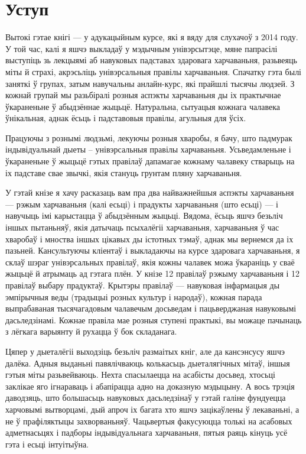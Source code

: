 \chapter*{Уступ}

Вытокі гэтае кнігі — у адукацыйным курсе, які я вяду для слухачоў з 2014 году. У той час, калі я яшчэ выкладаў у мэдычным унівэрсытэце, мяне папрасілі выступіць зь лекцыямі аб навуковых падставах здаровага харчаваньня, разьвеяць міты й страхі, акрэсьліць унівэрсальныя правілы харчаваньня. Спачатку гэта былі заняткі ў групах, затым навучальны анлайн-курс, які прайшлі тысячы людзей. З кожнай групай мы разьбіралі розныя аспэкты харчаваньня ды іх практычнае ўкараненьне ў абыдзённае жыцьцё. Натуральна, сытуацыя кожнага чалавека ўнікальная, аднак ёсьць і падставовыя правілы, агульныя для ўсіх. 

Працуючы з рознымі людзьмі, лекуючы розныя хваробы, я бачу, што падмурак індывідуальнай дыеты – унівэрсальныя правілы харчаваньня. Усьведамленьне і ўкараненьне ў жыцьцё гэтых правілаў дапамагае кожнаму чалавеку стварыць на іх падставе свае звычкі, якія стануць грунтам пляну харчаваньня.

У гэтай кнізе я хачу расказаць вам пра два найважнейшыя аспэкты харчаваньня — рэжым харчаваньня (калі есьці) і прадукты харчаваньня (што есьці) — і навучыць імі карыстацца ў абыдзённым жыцьці. Вядома, ёсьць яшчэ безьліч іншых пытаньняў, якія датычаць псыхалёгіі харчаваньня, харчаваньня ў час хваробаў і мноства іншых цікавых ды істотных тэмаў, аднак мы вернемся да іх пазьней. Кансультуючы кліентаў і выкладаючы на курсе здаровага харчаваньня, я склаў шэраг унівэрсальных правілаў, якія кожны чалавек можа ўкараніць у сваё жыцьцё й атрымаць ад гэтага плён. У кнізе 12 правілаў рэжыму харчаваньня і 12 правілаў выбару прадуктаў. Крытэры правілаў — навуковая інфармацыя ды эмпірычныя веды (традыцыі розных культур і народаў), кожная парада выпрабаваная тысячагадовым чалавечым досьведам і пацьверджаная навуковымі дасьледзінамі. Кожнае правіла мае розныя ступені практыкі, вы можаце пачынаць з лёгкага варыянту й рухацца ў бок складанага.

Цяпер у дыеталёгіі выходзіць безьліч размаітых кніг, але да кансэнсусу яшчэ далёка. Адныя выданьні павялічваюць колькасьць дыеталягічных мітаў, іншыя гэтыя міты разьвейваюць. Нехта спасылаецца на асабісты досьвед, хтосьці заклікае яго ігнараваць і абапірацца адно на доказную мэдыцыну. А вось трэція даводзяць, што большасьць навуковых дасьледзінаў у гэтай галіне фундуецца харчовымі вытворцамі, дый апроч іх багата хто яшчэ зацікаўлены ў лекаваньні, а не ў прафіляктыцы захворваньняў. Чацьвертыя факусуюцца толькі на асабовых адметнасьцях і падборы індывідуальнага харчаваньня, пятыя раяць кінуць усё гэта і есьці інтуітыўна.

